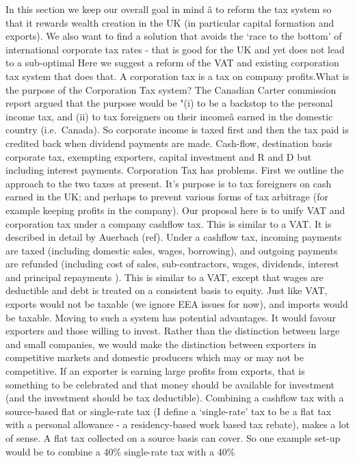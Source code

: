 \documentclass[]{tufte-handout}
\begin{document}
In this section we keep our overall goal in mind â to reform the tax
system so that it rewards wealth creation in the UK (in particular
capital formation and exports). We also want to find a solution that
avoids the `race to the bottom' of international corporate tax rates -
that is good for the UK and yet does not lead to a sub-optimal Here we
suggest a reform of the VAT and existing corporation tax system that
does that. A corporation tax is a tax on company profits.What is the
purpose of the Corporation Tax system? The Canadian Carter commission
report argued that the purpose would be "(i) to be a backstop to the
personal income tax, and (ii) to tax foreigners on their incomeâ
earned in the domestic country (i.e.~Canada). So corporate income is
taxed first and then the tax paid is credited back when dividend
payments are made. Cash-flow, destination basis corporate tax, exempting
exporters, capital investment and R and D but including interest
payments. Corporation Tax has problems. First we outline the approach to
the two taxes at present. It's purpose is to tax foreigners on cash
earned in the UK; and perhaps to prevent various forms of tax arbitrage
(for example keeping profits in the company). Our proposal here is to
unify VAT and corporation tax under a company cashflow tax. This is
similar to a VAT. It is described in detail by Auerbach (ref). Under a
cashflow tax, incoming payments are taxed (including domestic sales,
wages, borrowing), and outgoing payments are refunded (including cost of
sales, sub-contractors, wages, dividends, interest and principal
repayments ). This is similar to a VAT, except that wages are deductible
and debt is treated on a consistent basis to equity. Just like VAT,
exports would not be taxable (we ignore EEA issues for now), and imports
would be taxable. Moving to such a system has potential advantages. It
would favour exporters and those willing to invest. Rather than the
distinction between large and small companies, we would make the
distinction between exporters in competitive markets and domestic
producers which may or may not be competitive. If an exporter is earning
large profits from exports, that is something to be celebrated and that
money should be available for investment (and the investment should be
tax deductible). Combining a cashflow tax with a source-based flat or
single-rate tax (I define a `single-rate' tax to be a flat tax with a
personal allowance - a residency-based work based tax rebate), makes a
lot of sense. A flat tax collected on a source basis can cover. So one
example set-up would be to combine a 40\% single-rate tax with a 40\%
\end{document}
